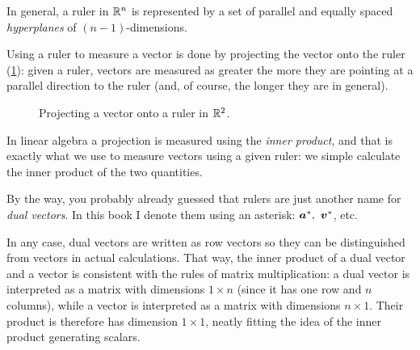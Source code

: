 In general, a ruler in $\Rs[n]$ is represented by a set of parallel and equally spaced \textit{hyperplanes} of $(n-1)$-dimensions. 

Using a ruler to measure a vector is done by projecting the vector onto the ruler (\cref{fig:vector_projection_on_ruler}): given a ruler, vectors are measured as greater the more they are pointing at a parallel direction to the ruler (and, of course, the longer they are in general).

\begin{figure}
    \begin{center}
    \end{center}
    \caption{Projecting a vector onto a ruler in $\Rs[2]$.}
    \label{fig:vector_projection_on_ruler}
\end{figure}

In linear algebra a projection is measured using the \textit{inner product}, and that is exactly what we use to measure vectors using a given ruler: we simple calculate the inner product of the two quantities.

By the way, you probably already guessed that rulers are just another name for \textit{dual vectors}. In this book I denote them using an asterisk: $\dualvec{a},\ \dualvec{v}$, etc.

In any case, dual vectors are written as row vectors so they can be distinguished from vectors in actual calculations. That way, the inner product of a dual vector and a vector is consistent with the rules of matrix multiplication: a dual vector is interpreted as a matrix with dimensions $1\times n$ (since it has one row and $n$ columns), while a vector is interpreted as a matrix with dimensions $n\times 1$. Their product is therefore has dimension $1\times 1$, neatly fitting the idea of the inner product generating scalars.

